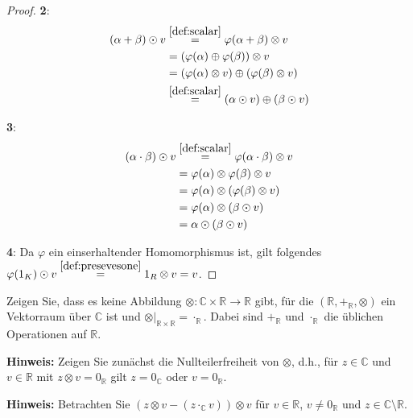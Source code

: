\documentclass{../problemset}
\begin{document}
\begin{problem}
\begin{proof}
	\textbf{2}: \begin{align*}
		(\alpha + \beta) \odot v & \stackrel{\ref{def:scalar}}{=} \varphi(\alpha + \beta) \otimes v       \\
		                         & = (\varphi(\alpha) \oplus \varphi(\beta)) \otimes v                    \\
		                         & = (\varphi(\alpha) \otimes v) \oplus (\varphi(\beta) \otimes v)        \\
		                         & \stackrel{\ref{def:scalar}}{=} (\alpha \odot v) \oplus (\beta \odot v)
	\end{align*}

	\textbf{3}: \begin{align*}
		(\alpha \cdot \beta) \odot v & \stackrel{\ref{def:scalar}}{=} \varphi(\alpha \cdot \beta) \otimes v \\
		                             & = \varphi(\alpha) \otimes \varphi(\beta) \otimes v                   \\
		                             & = \varphi(\alpha) \otimes (\varphi(\beta) \otimes v)                 \\
		                             & = \varphi(\alpha) \otimes (\beta \odot v)                            \\
		                             & = \alpha \odot (\beta \odot v)                                       \\
	\end{align*}

	\textbf{4}: Da $\varphi$ ein einserhaltender Homomorphismus ist, gilt folgendes $\varphi(1_K) \odot v \stackrel{\ref{def:presevesone}}{=} 1_R \otimes v = v$. \checkmark
\end{proof}
\end{problem}

\pagebreak

\begin{problem}
Zeigen Sie, dass es keine Abbildung $\otimes: \mathbb{C} \times \mathbb{R} \to \mathbb{R}$ gibt, für die $(\mathbb{R}, +_{\mathbb{R}}, \otimes)$ ein Vektorraum über $\mathbb{C}$ ist und $\otimes|_{\mathbb{R} \times \mathbb{R}} = \cdot_{\mathbb{R}}$. Dabei sind $+_{\mathbb{R}}$ und $\cdot_{\mathbb{R}}$ die üblichen Operationen auf $\mathbb{R}$.

\textbf{Hinweis:} Zeigen Sie zunächst die Nullteilerfreiheit von $\otimes$, d.h., für $z \in \mathbb{C}$ und $v \in \mathbb{R}$ mit $z \otimes v = 0_{\mathbb{R}}$ gilt $z = 0_{\mathbb{C}}$ oder $v = 0_{\mathbb{R}}$.

\textbf{Hinweis:} Betrachten Sie $(z \otimes v - (z \cdot_{\mathbb{C}} v)) \otimes v$ für $v \in \mathbb{R}$, $v \neq 0_{\mathbb{R}}$ und $z \in \mathbb{C} \setminus \mathbb{R}$.
\end{problem}
\end{document}
